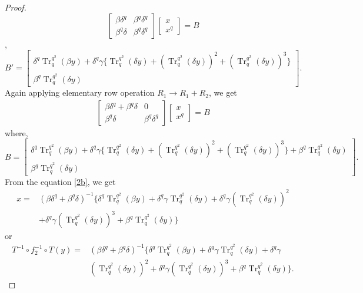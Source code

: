 \documentclass{birkjour}
\theoremstyle{definition}
\theoremstyle{remark}
\numberwithin{equation}{section}
\begin{document}
\begin{proof}
	$$\begin{bmatrix}
		\beta\delta^{q}&\beta^{q}\delta^{q}\\
		\beta^{q}\delta&\beta^{q}\delta^{q}
	\end{bmatrix}
	\begin{bmatrix}
		x\\x^{q}
	\end{bmatrix}=B$$
	,$$ B'=
	\begin{bmatrix}
		\delta^{q}\operatorname{Tr}_{q}^{q^2}(\beta y)+\delta^{q}\gamma\{\operatorname{Tr}_{q}^{q^2}(\delta y)+(\operatorname{Tr}_{q}^{q^2}(\delta y))^2+(\operatorname{Tr}_{q}^{q^2}(\delta y))^3\}\\
		\beta^{q}\operatorname{Tr}_{q}^{q^2}(\delta y)
	\end{bmatrix}.$$
	Again applying elementary row operation $R_1\rightarrow R_1+R_2$, we get
	\begin{align}\begin{bmatrix}
		\beta\delta^{q}+\beta^{q}\delta&0\\
		\beta^{q}\delta&\beta^{q}\delta^{q}
	\end{bmatrix}
	\begin{bmatrix}
		x\\x^{q}
	\end{bmatrix}=B\label{2b}\end{align}
	where,$$B=\begin{bmatrix}
		\delta^{q}\operatorname{Tr}_{q}^{q^2}(\beta y)+\delta^{q}\gamma\{\operatorname{Tr}_{q}^{q^2}(\delta y)+(\operatorname{Tr}_{q}^{q^2}(\delta y))^2+(\operatorname{Tr}_{q}^{q^2}(\delta y))^3\}+\beta^{q}\operatorname{Tr}_{q}^{q^2}(\delta y)\\
		\beta^{q}\operatorname{Tr}_{q}^{q^2}(\delta y)
	\end{bmatrix}.$$
		From the equation \ref{2b}, we get
		\begin{align*}
	x=&(\beta\delta^{q}+\beta^{q}\delta)^{-1}\{\delta^{q}\operatorname{Tr}_{q}^{q^2}(\beta y)+\delta^{q}\gamma\operatorname{Tr}_{q}^{q^2}(\delta y)+\delta^{q}\gamma(\operatorname{Tr}_{q}^{q^2}(\delta y))^2\\&+\delta^{q}\gamma(\operatorname{Tr}_{q}^{q^2}(\delta y))^3+\beta^{q}\operatorname{Tr}_{q}^{q^2}(\delta y)\}
	\end{align*}
	or
	\begin{align*}
	T^{-1}\circ f_2^{-1}\circ T(y)=&(\beta\delta^{q}+\beta^{q}\delta)^{-1}\{\delta^{q}\operatorname{Tr}_{q}^{q^2}(\beta y)+\delta^{q}\gamma\operatorname{Tr}_{q}^{q^2}(\delta y)+\delta^{q}\gamma\\&(\operatorname{Tr}_{q}^{q^2}(\delta y))^2+\delta^{q}\gamma(\operatorname{Tr}_{q}^{q^2}(\delta y))^3+\beta^{q}\operatorname{Tr}_{q}^{q^2}(\delta y)\}.

\end{align*}
\end{proof}
\end{document}
